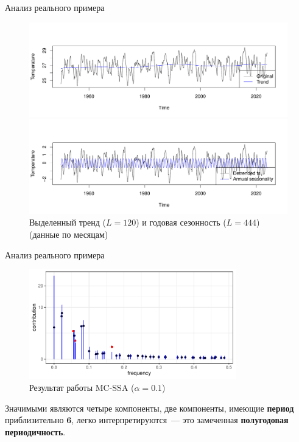 \documentclass[pdf,notheorems,10pt,intlimits, unicode]{beamer}
\begin{document}
\begin{frame}{Анализ реального примера}
  \begin{figure}
    \centering
    \includegraphics[width=\textwidth]{img/Nino_reconstruct_trend.pdf}\vspace{-2.8em}
    \includegraphics[width=\textwidth]{img/Nino_reconstruct_season.pdf}\vspace{-1em}
    Выделенный тренд ($L=120$) и годовая сезонность ($L=444$) (данные по месяцам)
  \end{figure}
\end{frame}

\begin{frame}{Анализ реального примера}
  \begin{figure}[h!]
    \centering
    \includegraphics[width=0.8\textwidth]{img/Nino_mcssa.pdf}
    \caption{Результат работы MC-SSA ($\alpha=0.1$)}
    \label{Nino_mcssa}
  \end{figure}
  Значимыми являются четыре компоненты, две компоненты, имеющие \textbf{период} приблизительно $\mathbf{6}$, легко интерпретируются~---  это замеченная \textbf{полугодовая периодичность}.
\end{frame}
\end{document}
